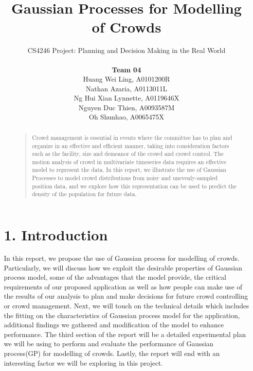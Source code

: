 \documentclass[letterpaper]{article}
\begin{document}
%
\title{Gaussian Processes for Modelling of Crowds}
\author{CS4246 Project: Planning and Decision Making in the Real World  \\ \\
{\bf Team 04} \\
Huang Wei Ling, A0101200R\\
Nathan Azaria, A0113011L\\
Ng Hui Xian Lynnette, A0119646X\\
Nguyen Duc Thien, A0093587M\\
Oh Shunhao, A0065475X\\
}
\maketitle
\begin{abstract}
\begin{quote}
Crowd management is essential in events where the committee has to plan and organize in an effective and efficient manner, taking into consideration factors such as the facility, size and demeanor of the crowd and crowd control. The motion analysis of crowd in multivariate timeseries data requires an effective model to represent the data. In this report, we illustrate the use of Gaussian Processes to model crowd distributions from noisy and unevenly-sampled position data, and we explore how this representation can be used to predict the density of the population for future data.
\end{quote}
\end{abstract}

\section{1.  Introduction}
In this report, we propose the use of Gaussian process for modelling of crowds. Particularly, we will discuss how we exploit the desirable properties of Gaussian process model, some of the advantages that the model provide, the critical requirements of our proposed application as well as how people can make use of the results of our analysis to plan and make decisions for future crowd controlling or crowd management. Next, we will touch on the technical details which includes the fitting on the characteristics of Gaussian process model for the application, additional findings we gathered and modification of the model to enhance performance. The third section of the report will be a detailed experimental plan we will be using to perform and evaluate the performance of Gaussian process(GP) for modelling of crowds. Lastly, the report will end with an interesting factor we will be exploring in this project.
\end{document}
